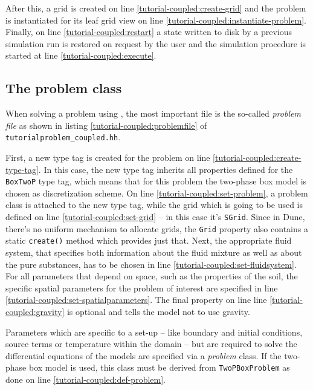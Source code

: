 After this, a grid is created on line
\ref{tutorial-coupled:create-grid} and the problem is instantiated for
its leaf grid view on line \ref{tutorial-coupled:instantiate-problem}.
Finally, on line \ref{tutorial-coupled:restart} a state written to
disk by a previous simulation run is restored on request by the user
and the simulation procedure is started at line
\ref{tutorial-coupled:execute}.

\subsection{The problem class}

When solving a problem using \Dumux, the most important file is the
so-called \textit{problem file} as shown in listing
\ref{tutorial-coupled:problemfile} of
\texttt{tutorialproblem\_coupled.hh}.

\begin{lst}\label{tutorial-coupled:problemfile} \mbox{}

\end{lst}

First, a new type tag is created for the problem on line
\ref{tutorial-coupled:create-type-tag}.  In this case, the new type
tag inherits all properties defined for the \texttt{BoxTwoP} type tag,
which means that for this problem the two-phase box model is chosen as
discretization scheme. On line \ref{tutorial-coupled:set-problem}, a
problem class is attached to the new type tag, while the grid which
is going to be used is defined on line \ref{tutorial-coupled:set-grid} --
in this case it's \texttt{SGrid}.  Since in Dune, there's no uniform
mechanism to allocate grids, the \texttt{Grid} property also contains
a static \texttt{create()} method which provides just that. Next,
the appropriate fluid system, that specifies both information about
the fluid mixture as well as about the pure substances, has to be chosen 
in line \ref{tutorial-coupled:set-fluidsystem}. For all parameters that 
depend on space, such as the properties of the soil, the specific spatial 
parameters for the problem of interest are specified in line
\ref{tutorial-coupled:set-spatialparameters}. The final property on line line
\ref{tutorial-coupled:gravity} is optional and tells the model not to
use gravity.

Parameters which are specific to a set-up -- like boundary and initial
conditions, source terms or temperature within the domain -- but are
required to solve the differential equations of the models are
specified via a \textit{problem} class. If the two-phase box model is
used, this class must be derived from \texttt{TwoPBoxProblem} as done
on line \ref{tutorial-coupled:def-problem}.

